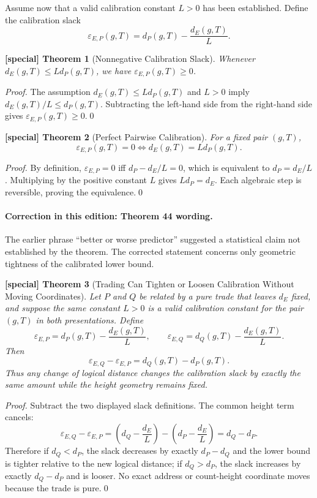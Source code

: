 \documentclass[11pt]{article}
\newtheorem{spthm}{[special] Theorem}
\newcommand{\dE}{d_E}
\begin{document}
Assume now that a valid calibration constant $L>0$ has been established. Define the calibration slack
\[
\varepsilon_{E,P}(g,T)=d_P(g,T)-\frac{\dE(g,T)}{L}.
\]

\begin{spthm}[Nonnegative Calibration Slack]
Whenever $\dE(g,T)\le Ld_P(g,T)$, we have $\varepsilon_{E,P}(g,T)\ge0$.
\end{spthm}
\textit{Proof.} The assumption $d_E(g,T)\le Ld_P(g,T)$ and $L>0$ imply $d_E(g,T)/L\le d_P(g,T)$. Subtracting the left-hand side from the right-hand side gives $\varepsilon_{E,P}(g,T)\ge0$.\qed


\begin{spthm}[Perfect Pairwise Calibration]
For a fixed pair $(g,T)$,
\[
\varepsilon_{E,P}(g,T)=0
\iff
\dE(g,T)=Ld_P(g,T).
\]
\end{spthm}
\textit{Proof.} By definition, $\varepsilon_{E,P}=0$ iff $d_P-d_E/L=0$, which is equivalent to $d_P=d_E/L$. Multiplying by the positive constant $L$ gives $Ld_P=d_E$. Each algebraic step is reversible, proving the equivalence.\qed


\paragraph{Correction in this edition: Theorem 44 wording.}
The earlier phrase ``better or worse predictor'' suggested a statistical claim not established by the theorem. The corrected statement concerns only geometric tightness of the calibrated lower bound.

\begin{spthm}[Trading Can Tighten or Loosen Calibration Without Moving Coordinates]
Let $P$ and $Q$ be related by a pure trade that leaves $\dE$ fixed, and suppose the same constant $L>0$ is a valid calibration constant for the pair $(g,T)$ in both presentations. Define
\[
\varepsilon_{E,P}=d_P(g,T)-\frac{\dE(g,T)}{L},\qquad
\varepsilon_{E,Q}=d_Q(g,T)-\frac{\dE(g,T)}{L}.
\]
Then
\[
\varepsilon_{E,Q}-\varepsilon_{E,P}=d_Q(g,T)-d_P(g,T).
\]
Thus any change of logical distance changes the calibration slack by exactly the same amount while the height geometry remains fixed.
\end{spthm}
\textit{Proof.} Subtract the two displayed slack definitions. The common height term cancels:
\[
\varepsilon_{E,Q}-\varepsilon_{E,P}=\left(d_Q-\frac{d_E}{L}\right)-\left(d_P-\frac{d_E}{L}\right)=d_Q-d_P.
\]
Therefore if $d_Q<d_P$, the slack decreases by exactly $d_P-d_Q$ and the lower bound is tighter relative to the new logical distance; if $d_Q>d_P$, the slack increases by exactly $d_Q-d_P$ and is looser. No exact address or count-height coordinate moves because the trade is pure.\qed
\end{document}
